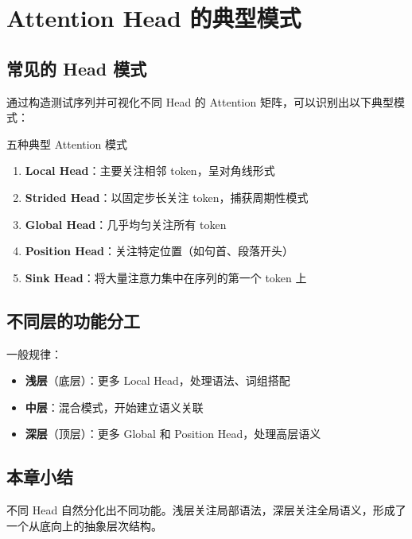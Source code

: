 \section{Attention Head 的典型模式}

\subsection{常见的 Head 模式}

通过构造测试序列并可视化不同 Head 的 Attention 矩阵，可以识别出以下典型模式：

\begin{importantbox}{五种典型 Attention 模式}
\begin{enumerate}
  \item \textbf{Local Head}：主要关注相邻 token，呈对角线形式
  \item \textbf{Strided Head}：以固定步长关注 token，捕获周期性模式
  \item \textbf{Global Head}：几乎均匀关注所有 token
  \item \textbf{Position Head}：关注特定位置（如句首、段落开头）
  \item \textbf{Sink Head}：将大量注意力集中在序列的第一个 token 上
\end{enumerate}
\end{importantbox}

\subsection{不同层的功能分工}

一般规律：
\begin{itemize}
  \item \textbf{浅层}（底层）：更多 Local Head，处理语法、词组搭配
  \item \textbf{中层}：混合模式，开始建立语义关联
  \item \textbf{深层}（顶层）：更多 Global 和 Position Head，处理高层语义
\end{itemize}

\subsection{本章小结}

不同 Head 自然分化出不同功能。浅层关注局部语法，深层关注全局语义，形成了一个从底向上的抽象层次结构。

